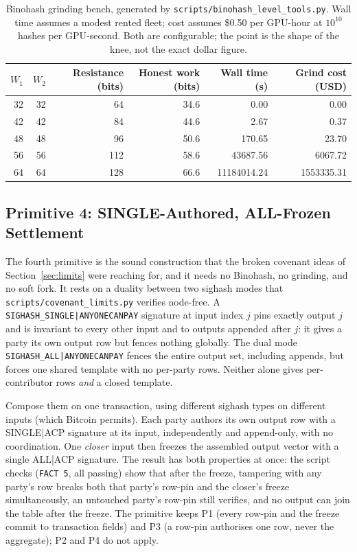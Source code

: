 \documentclass[11pt]{article}
\begin{document}
\begin{table}[t]
\centering
\small
\begin{tabular}{rrrrrr}
\toprule
$W_1$ & $W_2$ & Resistance (bits) & Honest work (bits) & Wall time (s) & Grind cost (USD) \\
\midrule
32 & 32 & 64 & 34.6 & 0.00 & 0.00 \\
42 & 42 & 84 & 44.6 & 2.67 & 0.37 \\
48 & 48 & 96 & 50.6 & 170.65 & 23.70 \\
56 & 56 & 112 & 58.6 & 43687.56 & 6067.72 \\
64 & 64 & 128 & 66.6 & 11184014.24 & 1553335.31 \\
\bottomrule
\end{tabular}
\caption{Binohash grinding bench, generated by
\texttt{scripts/binohash\_level\_tools.py}. Wall time assumes a modest rented
fleet; cost assumes \$0.50 per GPU-hour at $10^{10}$ hashes per GPU-second.
Both are configurable; the point is the shape of the knee, not the exact
dollar figure.}
\label{tab:binohash}
\end{table}

\subsection{Primitive 4: SINGLE-Authored, ALL-Frozen Settlement}
\label{sec:prim4}

The fourth primitive is the sound construction that the broken covenant ideas
of Section~\ref{sec:limits} were reaching for, and it needs no Binohash, no
grinding, and no soft fork. It rests on a duality between two sighash modes that
\texttt{scripts/covenant\_limits.py} verifies node-free. A
\texttt{SIGHASH\_SINGLE|ANYONECANPAY} signature at input index $j$ pins exactly
output $j$ and is invariant to every other input and to outputs appended after
$j$: it gives a party its own output row but fences nothing globally. The dual
mode \texttt{SIGHASH\_ALL|ANYONECANPAY} fences the entire output set, including
appends, but forces one shared template with no per-party rows. Neither alone
gives per-contributor rows \emph{and} a closed template.

Compose them on one transaction, using different sighash types on different
inputs (which Bitcoin permits). Each party authors its own output row with a
SINGLE|ACP signature at its input, independently and append-only, with no
coordination. One \emph{closer} input then freezes the assembled output vector
with a single ALL|ACP signature. The result has both properties at once: the
script checks (\texttt{FACT 5}, all passing) show that after the freeze,
tampering with any party's row breaks both that party's row-pin and the closer's
freeze simultaneously, an untouched party's row-pin still verifies, and no output
can join the table after the freeze. The primitive keeps P1 (every row-pin and
the freeze commit to transaction fields) and P3 (a row-pin authorises one row,
never the aggregate); P2 and P4 do not apply.
\end{document}
